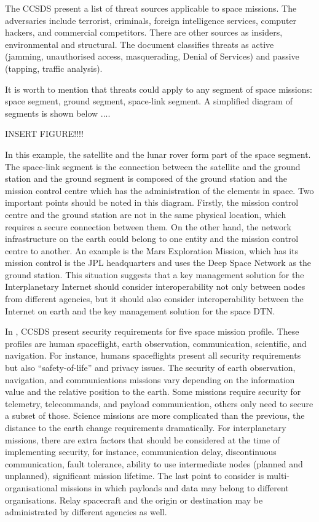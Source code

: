 The CCSDS present a list of threat sources applicable to space missions. The adversaries include terrorist, criminals, foreign intelligence services, computer hackers, and commercial competitors. There are other sources as insiders, environmental and structural. The document classifies threats as active (jamming, unauthorised access, masquerading, Denial of Services) and passive (tapping, traffic analysis). 

It is worth to mention that threats could apply to any segment of space missions: space segment, ground segment, space-link segment. A simplified diagram of segments is shown below ....

INSERT FIGURE!!!!

In this example, the satellite and the lunar rover form part of the space segment. The space-link segment is the connection between the satellite and the ground station and the ground segment is composed of the ground station and the mission control centre which has the administration of the elements in space. Two important points should be noted in this diagram.  Firstly, the mission control centre and the ground station are not in the same physical location, which requires a secure connection between them. On the other hand, the network infrastructure on the earth could belong to one entity and the mission control centre to another. An example is the Mars Exploration Mission, which has its mission control is the JPL headquarters and uses the Deep Space Network as the ground station. This situation suggests that a key management solution for the Interplanetary Internet should consider interoperability not only between nodes from different agencies, but it should also consider interoperability between the Internet on earth and the key management solution for the space DTN. 

 In \cite{book2012architecture}, CCSDS present security requirements for five space mission profile. These profiles are human spaceflight, earth observation, communication, scientific, and navigation. For instance, humans spaceflights present all security requirements but also ``safety-of-life'' and privacy issues. The security of earth observation, navigation, and communications missions vary depending on the information value and the relative position to the earth. Some missions require security for telemetry, telecommands, and payload communication, others only need to secure a subset of those. Science missions are more complicated than the previous,  the distance to the earth change requirements dramatically. For interplanetary missions, there are extra factors that should be considered at the time of implementing security, for instance, communication delay, discontinuous communication, fault tolerance, ability to use intermediate nodes (planned and unplanned), significant mission lifetime. The last point to consider is multi-organisational missions in which payloads and data may belong to different organisations. Relay spacecraft and the origin or destination may be administrated by different agencies as well. 

